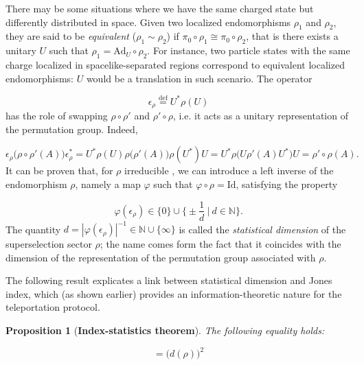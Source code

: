 \documentclass[a4paper,11pt]{article}
\newcommand{\eqdef}{\overset{\mathrm{def}}{=}}
\newtheorem{Proposition}{Proposition}[subsection]
\begin{document}
There may be some situations where we have the same charged state but differently distributed in space. Given two localized endomorphisms $\rho_1$ and $\rho_2$, they are said to be \textit{equivalent} ($\rho_1 \sim \rho_2$) if $\pi_0 \circ \rho_1 \cong \pi_0 \circ \rho_2$, that is there exists a unitary $U$ such that $\rho_1 = \mathrm{Ad}_U \circ \rho_2$. For instance, two particle states with the same charge localized in spacelike-separated regions correspond to equivalent localized endomorphisms: $U$ would be a translation in such scenario. The operator

\begin{equation}
    \epsilon_{\rho} \eqdef U^* \rho(U)
\end{equation}
%
has the role of swapping $\rho \circ \rho'$ and $\rho' \circ \rho$, i.e. it acts as a unitary representation of the permutation group. Indeed,

\begin{equation}
    \epsilon_{\rho} \big( \rho \circ \rho' (A) \big) \epsilon_{\rho}^* = U^* \rho(U) \rho \big( \rho'(A) \big) \rho(U^*) U = U^* \rho \big( U \rho'(A) U^* \big) U = \rho' \circ \rho (A) \text{.}
\end{equation}
%
It can be proven that, for $\rho$ irreducible \cite{DHR}, we can introduce a left inverse of the endomorphism $\rho$, namely a map $\varphi$ such that $\varphi \circ \rho = \mathrm{Id}$, satisfying the property

\begin{equation}
    \varphi(\epsilon_{\rho}) \in \{ 0 \} \cup \Big\{ \pm \frac{1}{d} \ \bigg| \ d \in \mathbb{N} \Big\} \text{.}
\end{equation}
%
The quantity $d = |\varphi(\epsilon_{\rho})|^{-1} \in \mathbb{N} \cup \{ \infty \}$ is called the \textit{statistical dimension} of the superselection sector $\rho$; the name comes form the fact that it coincides with the dimension of the representation of the permutation group associated with $\rho$.

The following result explicates a link between statistical dimension and Jones index, which (as shown earlier) provides an information-theoretic nature for the teleportation protocol.

\begin{Proposition}[\textbf{Index-statistics theorem}]
    The following equality holds:
    
    \begin{equation}
        [\mathcal{A}(\mathcal{O}):\rho \big( \mathcal{A}(\mathcal{O}) \big)] = \big( d(\rho) \big)^2
        \label{index-statistics}
    \end{equation}
\end{Proposition}
\end{document}
